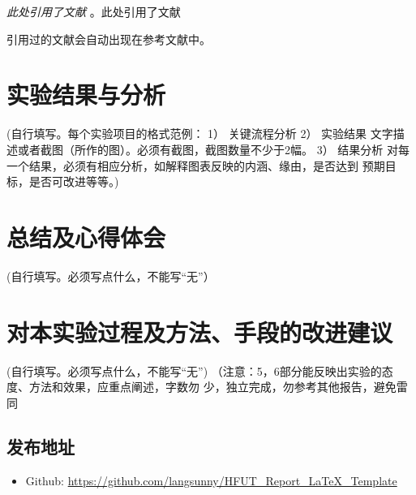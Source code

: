\documentclass[12pt,hyperref,a4paper,twoside,UTF8]{ctexart}
\begin{document}
   \textit{ 此处引用了文献}
   \cite{DBLP:conf/nips/VaswaniSPUJGKP17}。此处引用了文献\cite{DBLP:conf/nips/VaswaniSPUJGKP17}


引用过的文献会自动出现在参考文献中。

\section{实验结果与分析}
 (自行填写。每个实验项目的格式范例：
1） 关键流程分析
2） 实验结果
文字描述或者截图（所作的图）。必须有截图，截图数量不少于2幅。
3） 结果分析
对每一个结果，必须有相应分析，如解释图表反映的内涵、缘由，是否达到
预期目标，是否可改进等等。)
\section{总结及心得体会}

 (自行填写。必须写点什么，不能写“无”）
\section{对本实验过程及方法、手段的改进建议}


 (自行填写。必须写点什么，不能写“无”)
（注意：5，6部分能反映出实验的态度、方法和效果，应重点阐述，字数勿
少，独立完成，勿参考其他报告，避免雷同

\subsection{发布地址}
\begin{itemize}
    \item Github: \url{https://github.com/langsunny/HFUT_Report_LaTeX_Template}
\end{itemize}



\end{document}
